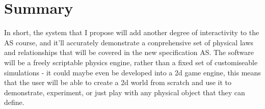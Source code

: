 \section{Summary}
In short, the system that I propose will add another degree of interactivity to the AS course, and it'll accurately demonstrate a conprehensive set of physical laws and relationships that will be covered in the new specification AS. The software will be a freely scriptable physics engine, rather than a fixed set of customiseable simulations - it could maybe even be developed into a 2d game engine, this means that the user will be able to create a 2d world from scratch and use it to demonstrate, experiment, or just play with any physical object that they can define.
